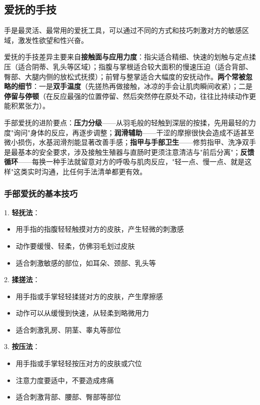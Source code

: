 \documentclass[12pt,UTF8]{ctexbook}
\begin{document}
\subsection{爱抚的手技}

手是最灵活、最常用的爱抚工具，可以通过不同的方式和技巧刺激对方的敏感区域，激发性欲望和性兴奋。


爱抚的手技差异主要来自\textbf{接触面与应用力度}：指尖适合精细、快速的划触与定点揉压（适合阴蒂、乳头等区域）；指腹与掌根适合较大面积的慢速压迫（适合背部、臀部、大腿内侧的放松式抚摸）；前臂与整掌适合大幅度的安抚动作。\textbf{两个常被忽略的细节}：一是\textbf{双手温度}（先搓热再做接触，冰凉的手会让肌肉瞬间收紧）；二是\textbf{停留与停顿}（在反应最强的位置停留、然后突然停在原处不动，往往比持续动作更能积累张力）。

手部爱抚的进阶要点：\textbf{压力分级}——从羽毛般的轻触到深层的按揉，先用最轻的力度"询问"身体的反应，再逐步调整；\textbf{润滑辅助}——干涩的摩擦很快会造成不适甚至微小损伤，水基润滑剂能显著改善手感；\textbf{指甲与手部卫生}——修剪指甲、洗净双手是最基本的安全要求，涉及接触生殖器与直肠时更须注意清洁与"前后分离"；\textbf{反馈循环}——每换一种手法就留意对方的呼吸与肌肉反应，"轻一点、慢一点、就是这样"这类实时沟通，比任何手法清单都更有效。


\subsubsection{手部爱抚的基本技巧}

1. \textbf{轻抚法}：
  \begin{itemize}
  \item 用手指的指腹轻轻触摸对方的皮肤，产生轻微的刺激感
  \item 动作要缓慢、轻柔，仿佛羽毛划过皮肤
  \item 适合刺激敏感的部位，如耳朵、颈部、乳头等
  \end{itemize}

2. \textbf{揉搓法}：
  \begin{itemize}
  \item 用手指或手掌轻轻揉搓对方的皮肤，产生摩擦感
  \item 动作可以从缓慢到快速，从轻柔到略微用力
  \item 适合刺激乳房、阴茎、睾丸等部位
  \end{itemize}

3. \textbf{按压法}：
  \begin{itemize}
  \item 用手指或手掌轻轻按压对方的皮肤或穴位
  \item 注意力度要适中，不要造成疼痛
  \item 适合刺激背部、腰部、臀部等部位
  \end{itemize}
\end{document}

